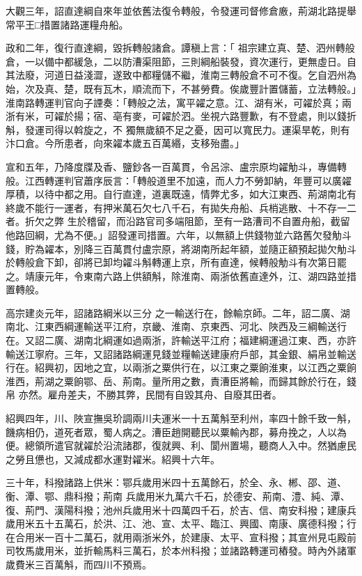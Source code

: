 \begin{pinyinscope}
 大觀三年，詔直達綱自來年並依舊法復令轉般，令發運司督修倉廒，荊湖北路提舉常平王□措置諸路運糧舟船。



 政和二年，復行直達綱，毀拆轉般諸倉。譚稹上言：「
 祖宗建立真、楚、泗州轉般倉，一以備中都緩急，二以防漕渠阻節，三則綱船裝發，資次運行，更無虛日。自其法廢，河道日益淺澀，遂致中都糧儲不繼，淮南三轉般倉不可不復。乞自泗州為始，次及真、楚，既有瓦木，順流而下，不甚勞費。俟歲豐計置儲蓄，立法轉般。」淮南路轉運判官向子諲奏：「轉般之法，寓平糴之意。江、湖有米，可糴於真；兩浙有米，可糴於揚；宿、亳有麥，可糴於泗。坐視六路豐歉，有不登處，則以錢折斛，發運司得以斡旋之，不
 獨無歲額不足之憂，因可以寬民力。運渠旱乾，則有汴口倉。今所患者，向來糴本歲五百萬緡，支移殆盡。」



 宣和五年，乃降度牒及香、鹽鈔各一百萬貫，令呂淙、盧宗原均糴觔斗，專備轉般。江西轉運判官蕭序辰言：「轉般道里不加遠，而人力不勞卸納，年豐可以廣糴厚積，以待中都之用。自行直達，道裏既遠，情弊尤多，如大江東西、荊湖南北有終歲不能行一運者，有押米萬石欠七八千石，有拋失舟船、兵梢逃散、十不存一二者。折欠之弊
 生於稽留，而沿路官司多端阻節，至有一路漕司不自置舟船，截留他路回綱，尤為不便。」詔發運司措置。六年，以無額上供錢物並六路舊欠發觔斗錢，貯為糴本，別降三百萬貫付盧宗原，將湖南所起年額，並隨正額預起拋欠觔斗於轉般倉下卸，卻將已卸均糴斗斛轉運上京，所有直達，候轉般觔斗有次第日罷之。靖康元年，令東南六路上供額斛，除淮南、兩浙依舊直達外，江、湖四路並措置轉般。



 高宗建炎元年，詔諸路綱米以三分
 之一輸送行在，餘輸京師。二年，詔二廣、湖南北、江東西綱運輸送平江府，京畿、淮南、京東西、河北、陜西及三綱輸送行在。又詔二廣、湖南北綱運如過兩浙，許輸送平江府；福建綱運過江東、西，亦許輸送江寧府。三年，又詔諸路綱運見錢並糧輸送建康府戶部，其金銀、絹帛並輸送行在。紹興初，因地之宜，以兩浙之粟供行在，以江東之粟餉淮東，以江西之粟餉淮西，荊湖之粟餉鄂、岳、荊南。量所用之數，責漕臣將輸，而歸其餘於行在，錢帛
 亦然。雇舟差夫，不勝其弊，民間有自毀其舟、自廢其田者。



 紹興四年，川、陜宣撫吳玠調兩川夫運米一十五萬斛至利州，率四十餘千致一斛，饑病相仍，道死者眾，蜀人病之。漕臣趙開聽民以粟輸內郡，募舟挽之，人以為便。總領所遣官就糴於沿流諸郡，復就興、利、閬州置場，聽商人入中。然猶慮民之勞且憊也，又減成都水運對糴米。紹興十六年。



 三十年，科撥諸路上供米：鄂兵歲用米四十五萬餘石，於全、永、郴、邵、道、衡、潭、鄂、鼎科撥；荊南
 兵歲用米九萬六千石，於德安、荊南、澧、純、潭、復、荊門、漢陽科撥；池州兵歲用米十四萬四千石，於吉、信、南安科撥；建康兵歲用米五十五萬石，於洪、江、池、宣、太平、臨江、興國、南康、廣德科撥；行在合用米一百十二萬石，就用兩浙米外，於建康、太平、宣科撥；其宣州見屯殿前司牧馬歲用米，並折輸馬料三萬石，於本州科撥；並諸路轉運司樁發。時內外諸軍歲費米三百萬斛，而四川不預焉。




\end{pinyinscope}
